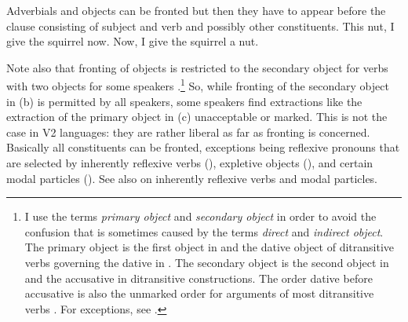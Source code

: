 \eal
{}
\zl 
Adverbials and objects can be fronted but then they have to appear before the clause consisting of
subject and verb and possibly other constituents.
\eal
\ex This nut, I give the squirrel now. 
\ex Now, I give the squirrel a nut.
\zl

Note also that fronting of objects is restricted to the secondary object for verbs with two objects
for some speakers \citep[]{Hudson92a-u}.\footnote{
  I use the terms \emph{primary object} and \emph{secondary
    object} \citep[280]{PS92a} in order to avoid the confusion that is sometimes
  caused by the terms \emph{direct} and \emph{indirect object}. The primary object is the first object in 
  and the dative object of ditransitive verbs governing the dative in . The secondary object
  is the second object in  and the accusative in  ditransitive constructions. The order
  dative before accusative is also the unmarked order for arguments of most ditransitive verbs
  \citep{Hoehle82a}. For exceptions, see .
} So, while fronting of the secondary object in
(b) is permitted by all speakers, some speakers find extractions like the extraction of the
primary object in (c) unacceptable or marked.
\vspace{-\baselineskip}
\eal
\judgewidth{\%}
\zl
This is not the case in V2 languages: they are rather liberal as far as fronting
is concerned. Basically all constituents can be fronted, exceptions being reflexive
pronouns that are selected by inherently reflexive verbs (), expletive objects (), and certain modal
particles (). See also  on inherently reflexive
verbs and modal particles.
\eal
{}
